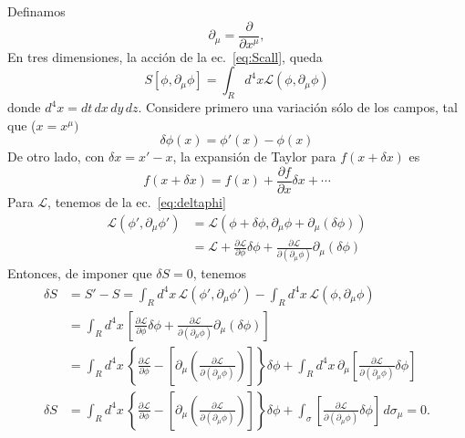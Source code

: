 Definamos
\begin{equation}
  \label{eq:dmu}
  \partial_\mu=\frac{\partial}{\partial x^\mu},
  \end{equation}
En tres dimensiones, la acci\'on de la ec.~\eqref{eq:Scall}, queda
\begin{equation}
  \label{eq:Scall3d}
  S[\phi,\partial_\mu\phi]=\int_{R}d^4x\mathcal{L}(\phi,\partial_\mu\phi)
\end{equation}
donde $d^4x=d t\,d x\, d y\,d z$.  Considere primero una variaci\'on s\'olo de
los campos, tal que ($x=x^\mu)$
\begin{equation}
  \label{eq:deltaphi}
  \delta\phi(x)=\phi'(x)-\phi(x)
\end{equation}
De otro lado, con $\delta x=x'-x$, la expansi\'on de Taylor para $f(x+\delta x)$ es
\begin{equation}
  f(x+\delta x)=f(x)+\frac{\partial f}{\partial x}\delta x+\cdots 
\end{equation}
Para $\mathcal{L}$, tenemos de la ec.~\eqref{eq:deltaphi}
\begin{align}
  \mathcal{L}(\phi',\partial_\mu\phi')&=\mathcal{L}(\phi+\delta\phi,\partial_\mu\phi+\partial_\mu(\delta\phi))\nonumber\\
  &=\mathcal{L}+\frac{\partial\mathcal{L}}{\partial\phi}\delta\phi+\frac{\partial\mathcal{L}}{\partial(\partial_\mu\phi)}\partial_\mu(\delta\phi)
\end{align}
Entonces, de imponer que $\delta S=0$, tenemos
\begin{align}
  \delta S&=S'-S=\int_{R}d^4x\,\mathcal{L}(\phi',\partial_\mu\phi')-\int_{R}d^4x\,\mathcal{L}(\phi,\partial_\mu\phi)\nonumber\\
&=\int_{R}d^4x\,
\left[
\frac{\partial\mathcal{L}}{\partial\phi}\delta\phi+\frac{\partial\mathcal{L}}{\partial(\partial_\mu\phi)}\partial_\mu(\delta\phi)
\right]\nonumber\\
 &=\int_{R}d^4x\,
  \left\{ 
    \frac{\partial\mathcal{L}}{\partial\phi}-\left[\partial_\mu\left(
      \frac{\partial\mathcal{L}}{\partial(\partial_\mu\phi)}
    \right)\right]
  \right\}\delta\phi+\int_{R}d^4x\,
    \partial_\mu\left[
      \frac{\partial\mathcal{L}}{\partial(\partial_\mu\phi)}\delta\phi
    \right]\nonumber\\
\label{eq:1}
\delta S&=\int_{R}d^4x\,
  \left\{ 
    \frac{\partial\mathcal{L}}{\partial\phi}-    
    \left[\partial_\mu\left(
      \frac{\partial\mathcal{L}}{\partial(\partial_\mu\phi)}
    \right)\right]
  \right\}\delta\phi+\int_{\sigma}\left[
      \frac{\partial\mathcal{L}}{\partial(\partial_\mu\phi)}\delta\phi
    \right]\,d\sigma_\mu=0.
\end{align}

